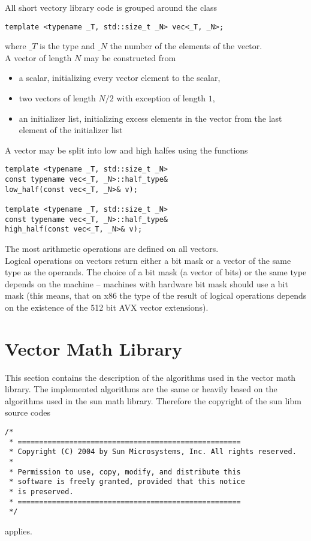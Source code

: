 \documentclass[10pt,a4paper,wide]{article}
\numberwithin{equation}{subsection}
\begin{document}
All short vectory library code is grouped around the class
\begin{lstlisting}
template <typename _T, std::size_t _N> vec<_T, _N>;
\end{lstlisting}
where $\_T$ is the type and $\_N$ the number of the elements of the
vector.\\
%
A vector of length $N$ may be constructed from
\begin{itemize}
\item a scalar, initializing every vector element to the scalar,
\item two vectors of length $N/2$ with exception of length $1$,
\item an initializer list, initializing excess elements in the
  vector from the last element of the initializer list
\end{itemize}
A vector may be split into low and high halfes using the functions
\begin{lstlisting}
template <typename _T, std::size_t _N>
const typename vec<_T, _N>::half_type&
low_half(const vec<_T, _N>& v);

template <typename _T, std::size_t _N>
const typename vec<_T, _N>::half_type&
high_half(const vec<_T, _N>& v);
\end{lstlisting}
The most arithmetic operations are defined on all vectors.\\
%
Logical operations on vectors return either a bit mask or a vector of
the same type as the operands. The choice of a bit mask (a vector of
bits) or the same type depends on the machine -- machines with
hardware bit mask should use a bit mask (this means, that on x86 the
type of the result of logical operations depends on the existence of
the 512 bit AVX vector extensions).

\section{Vector Math Library}
\label{sec:vec_math_lib}

This section contains the description of the algorithms used in the
vector math library. The implemented algorithms are the same or
heavily based on the algorithms used in the sun math
library. Therefore the copyright of the sun libm source codes
\begin{verbatim}
/*
 * ====================================================
 * Copyright (C) 2004 by Sun Microsystems, Inc. All rights reserved.
 *
 * Permission to use, copy, modify, and distribute this
 * software is freely granted, provided that this notice
 * is preserved.
 * ====================================================
 */
\end{verbatim}
applies.
\end{document}
